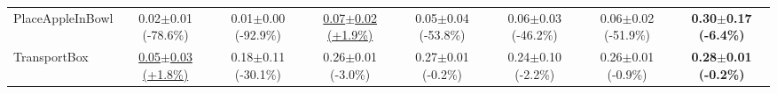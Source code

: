 \begin{table}[htbp]
\begin{adjustbox}{max width=\textwidth}
\begin{tabular}{l*{7}{c}}
PlaceAppleInBowl & 0.02$\pm$0.01 \scriptsize{(-78.6\%)} & 0.01$\pm$0.00 \scriptsize{(-92.9\%)} & \underline{0.07$\pm$0.02 \scriptsize{(+1.9\%)}} & 0.05$\pm$0.04 \scriptsize{(-53.8\%)} & 0.06$\pm$0.03 \scriptsize{(-46.2\%)} & 0.06$\pm$0.02 \scriptsize{(-51.9\%)} & \textbf{0.30$\pm$0.17 \scriptsize{(-6.4\%)}} \\
TransportBox & \underline{0.05$\pm$0.03 \scriptsize{(+1.8\%)}} & 0.18$\pm$0.11 \scriptsize{(-30.1\%)} & 0.26$\pm$0.01 \scriptsize{(-3.0\%)} & 0.27$\pm$0.01 \scriptsize{(-0.2\%)} & 0.24$\pm$0.10 \scriptsize{(-2.2\%)} & 0.26$\pm$0.01 \scriptsize{(-0.9\%)} & \textbf{0.28$\pm$0.01 \scriptsize{(-0.2\%)}} \\
\bottomrule
\end{tabular}
\end{adjustbox}
\end{table}

